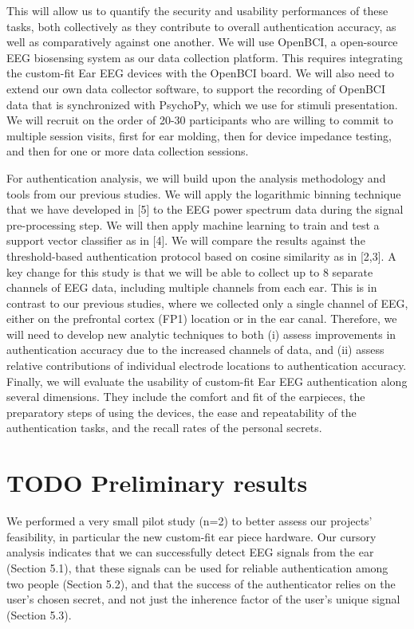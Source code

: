 \documentclass[11pt]{article}
\begin{document}
This will allow us to quantify the security and usability performances of these
tasks, both collectively as they contribute to overall authentication accuracy, as
well as comparatively against one another.
We will use OpenBCI, a open-source EEG biosensing system as our data
collection platform. This requires integrating the custom-fit Ear EEG devices with
the OpenBCI board. We will also need to extend our own data collector
software, to support the recording of OpenBCI data that is synchronized with
PsychoPy, which we use for stimuli presentation. We will recruit on the order of
20-30 participants who are willing to commit to multiple session visits, first for ear
molding, then for device impedance testing, and then for one or more data
collection sessions.

For authentication analysis, we will build upon the analysis methodology and
tools from our previous studies. We will apply the logarithmic binning technique
that we have developed in [5] to the EEG power spectrum data during the signal
pre-processing step. We will then apply machine learning to train and test a
support vector classifier as in [4]. We will compare the results against the
threshold-based authentication protocol based on cosine similarity as in [2,3].
A key change for this study is that we will be able to collect up to 8 separate
channels of EEG data, including multiple channels from each ear. This is in
contrast to our previous studies, where we collected only a single channel of
EEG, either on the prefrontal cortex (FP1) location or in the ear canal. Therefore,
we will need to develop new analytic techniques to both (i) assess improvements
in authentication accuracy due to the increased channels of data, and (ii) assess
relative contributions of individual electrode locations to authentication accuracy.
Finally, we will evaluate the usability of custom-fit Ear EEG authentication along
several dimensions. They include the comfort and fit of the earpieces, the
preparatory steps of using the devices, the ease and repeatability of the
authentication tasks, and the recall rates of the personal secrets.
\section{{\bfseries\sffamily TODO} Preliminary results}
\label{sec:org914f392}

We performed a very small pilot study (n=2) to better assess our projects' feasibility,
in particular the new custom-fit ear piece hardware.
Our cursory analysis indicates that we can successfully
detect EEG signals from the ear (Section 5.1), that these signals can be used
for reliable authentication among two people (Section 5.2), and that the success
of the authenticator relies on the user's chosen secret, and not just the inherence
factor of the user's unique signal (Section 5.3).
\end{document}
